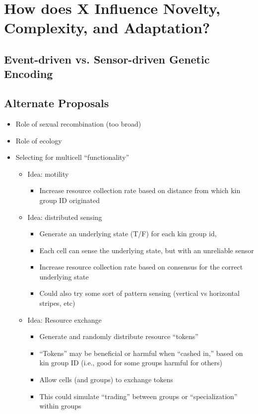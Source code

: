 \chapter{How does X Influence Novelty, Complexity, and Adaptation?}
\label{ch:influencing-cna}

\section{Event-driven vs. Sensor-driven Genetic Encoding}

\section{Alternate Proposals}

\begin{itemize}
  \item Role of sexual recombination (too broad)
  \item Role of ecology
  \item Selecting for multicell ``functionality''
  \begin{itemize}
    \item Idea: motility
    \begin{itemize}
      \item Increase resource collection rate based on distance from which kin group ID originated
    \end{itemize}
    \item Idea: distributed sensing
    \begin{itemize}
      \item Generate an underlying state (T/F) for each kin group id,
      \item Each cell can sense the underlying state, but with an unreliable sensor
      \item Increase resource collection rate based on consensus for the correct underlying state
      \item Could also try some sort of pattern sensing (vertical vs horizontal stripes, etc)
    \end{itemize}
    \item Idea: Resource exchange
    \begin{itemize}
      \item Generate and randomly distribute resource ``tokens''
      \item ``Tokens'' may be beneficial or harmful when ``cashed in,'' based on kin group ID (i.e., good for some groups harmful for others)
      \item Allow cells (and groups) to exchange tokens
      \item This could simulate “trading” between groups or “specialization” within groups
    \end{itemize}
  \end{itemize}
\end{itemize}
